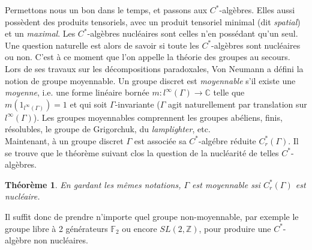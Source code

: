 \documentclass[a4paper,11pt]{article}
\newtheorem{theorem}{Th\'eor\`eme}
\begin{document}
Permettons nous un bon dans le temps, et passons aux $C^*$-alg\`ebres. Elles aussi poss\`edent des produits tensoriels, avec un produit tensoriel minimal (dit \textit{spatial}) et un \textit{maximal}. Les $C^*$-alg\`ebres nucl\'eaires sont celles n'en poss\'edant qu'un seul. Une question naturelle est alors de savoir si toute les $C^*$-alg\`ebres sont nucl\'eaires ou non. C'est \`a ce moment que l'on appelle la th\'eorie des groupes au secours. Lors de ses travaux sur les d\'ecompositions paradoxales, Von Neumann a d\'efini la notion de groupe moyennable. Un groupe discret est \textit{moyennable} s'il existe une \textit{moyenne}, i.e. une forme lin\'eaire born\'ee $m : l^\infty (\Gamma) \rightarrow \mathbb C$ telle que $m(1_{l^\infty(\Gamma)}) = 1$ et qui soit $\Gamma$-invariante ($\Gamma$ agit naturellement par translation sur $l^\infty (\Gamma)$). Les groupes moyennables comprennent les groupes ab\'eliens, finis, r\'esolubles, le groupe de Grigorchuk, du \textit{lamplighter}, etc.\\

Maintenant, \`a un groupe discret $\Gamma$ est associ\'ee sa $C^*$-alg\'ebre r\'eduite $C^*_r(\Gamma)$. Il se trouve que le th\'eor\`eme suivant clos la question de la nucl\'earit\'e de telles $C^*$-alg\`ebres. 

\begin{theorem}En gardant les m\^emes notations, $\Gamma$ est moyennable ssi $C^*_r(\Gamma)$ est nucl\'eaire.
\end{theorem}

Il suffit donc de prendre n'importe quel groupe non-moyennable, par exemple le groupe libre \`a 2 g\'en\'erateurs $\mathbb F_2$ ou encore $SL(2,\mathbb Z)$, pour produire une $C^*$-alg\`ebre non nucl\'eaires.\\    
\end{document}
